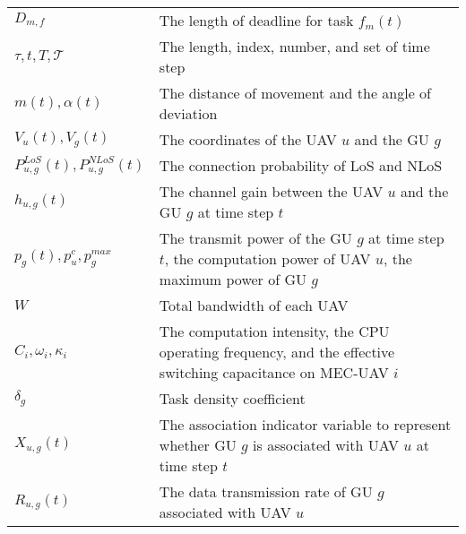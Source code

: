 \begin{table*}[]
\begin{tabularx}{\textwidth}{ll}
$D_{m,f}$                                  & The length of deadline for task $f_m(t)$  \\
$\tau, t, T, \mathcal{T}$                  & The length, index, number, and set of time step                                                                                                                     \\
$m(t), \alpha(t)$                          & The distance of movement and the angle of deviation                                                                                                                \\
$V_u(t), V_g(t)$                           & The coordinates of the UAV $u$ and the GU $g$                                                                                                                          \\
$P_{u,g}^{LoS}(t), P_{u,g}^{NLoS}(t)$ & The connection probability of LoS and NLoS  \\
$h_{u,g}(t)$                               & The channel gain between the UAV $u$ and the GU $g$ at time step $t$                                                                                                     \\
$p_g(t), p_u^c, p_g^{max}$                 & The transmit power of the GU $g$ at time step $t$, the computation power of UAV $u$, the maximum power of GU $g$                                                           \\
$W$                                        & Total bandwidth of each UAV                                                                                                                                        \\
$C_i, \omega_i, \kappa_i$                            & The computation intensity, the CPU operating frequency, 
               and the effective switching capacitance on MEC-UAV $i$           \\
$\delta_g$                                 & Task density coefficient       \\
$X_{u,g}(t)$                      & The association indicator variable to represent whether GU $g$ is associated with UAV $u$ at time step $t$                                                        \\
$R_{u,g}(t) $                              & The data transmission rate of GU $g$ associated with UAV $u$                                                                                                           \\

\end{tabularx}
\end{table*}
